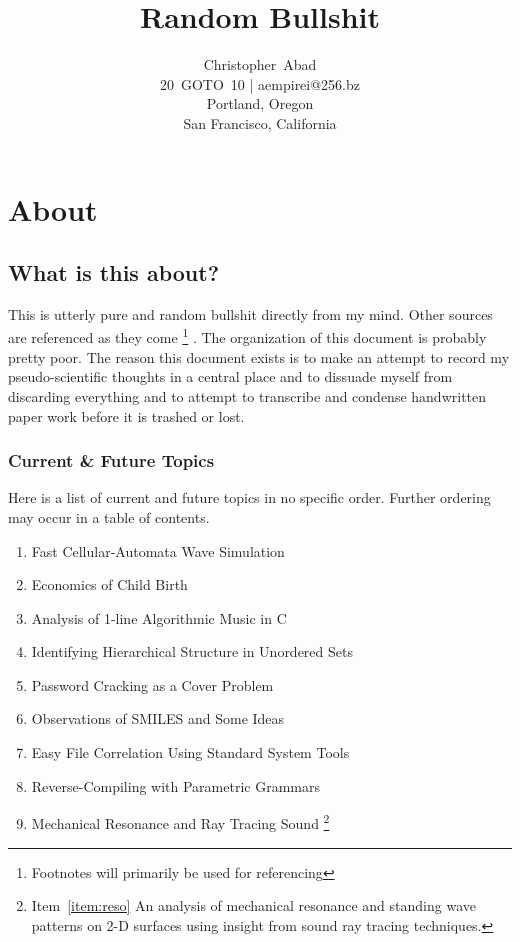 \documentclass[11pt]{book}
\title{Random Bullshit}
\author{Christopher~Abad \\
20~GOTO~10 | aempirei@256.bz \\
Portland, Oregon \\
San Francisco, California }
\begin{document}
\maketitle

\chapter{About}

\section{What is this about?}

This is utterly pure and random bullshit directly from my mind. Other sources are referenced as they come%
\footnote{Footnotes will primarily be used for referencing}
.  The organization of this document is probably pretty poor. The reason this document exists is to make an attempt to record my pseudo-scientific thoughts in a central place and to dissuade myself from discarding everything and to attempt to transcribe and condense handwritten paper work before it is trashed or lost.

\subsection{Current \& Future Topics}

Here is a list of current and future topics in no specific order. Further ordering may occur in a table of contents.

\begin{enumerate}
	\item Fast Cellular-Automata Wave Simulation
	\item Economics of Child Birth
	\item Analysis of 1-line Algorithmic Music in C
	\item Identifying Hierarchical Structure in Unordered Sets
	\item Password Cracking as a Cover Problem
	\item Observations of SMILES and Some Ideas
	\item Easy File Correlation Using Standard System Tools
	\item Reverse-Compiling with Parametric Grammars
	\item \label{item:reso} Mechanical Resonance and Ray Tracing Sound%
\footnote{Item~\ref{item:reso} An analysis of mechanical resonance and standing wave patterns on 2-D surfaces using insight from sound ray tracing techniques.}
\end{enumerate}
\end{document}
